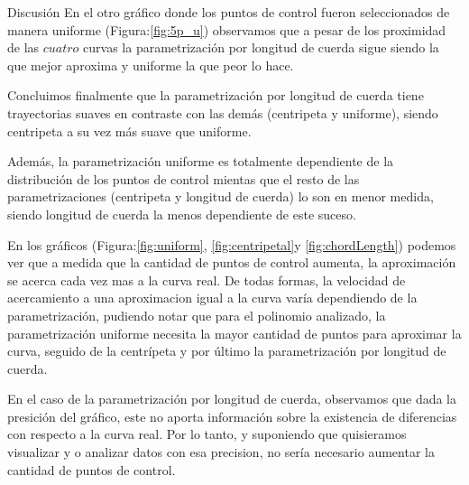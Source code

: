 \begin{section}{Discusión}
	En el otro gráfico donde los puntos de control fueron seleccionados de manera uniforme (Figura:\ref{fig:5p_u}) observamos que a pesar de los proximidad de las $cuatro$ curvas la parametrización por longitud de cuerda sigue siendo la que mejor aproxima y uniforme la que peor lo hace.
	
	Concluimos finalmente que la parametrización por longitud de cuerda tiene trayectorias suaves en contraste con las demás (centripeta y uniforme), siendo centripeta a su vez más suave que uniforme. 
	
	Además, la parametrización uniforme es totalmente dependiente de la distribución de los puntos de control mientas que el resto de las parametrizaciones (centripeta y longitud de cuerda) lo son en menor medida, siendo longitud de cuerda la menos dependiente de este suceso.
	
	En los gráficos (Figura:\ref{fig:uniform}, \ref{fig:centripetal}y \ref{fig:chordLength}) podemos ver que a medida que la cantidad de puntos de control aumenta, la aproximación se acerca cada vez mas a la curva real. De todas formas, la velocidad de acercamiento a una aproximacion igual a la curva varía dependiendo de la parametrización, pudiendo notar que para el polinomio analizado, la parametrización uniforme necesita la mayor cantidad de puntos para aproximar la curva, seguido de la centrípeta y por último la parametrización por longitud de cuerda.
	
	En el caso de la parametrización por longitud de cuerda, observamos que dada la presición del gráfico, este no aporta información sobre la existencia de diferencias con respecto a la curva real. Por lo tanto, y suponiendo que quisieramos visualizar y o analizar datos con esa precision, no sería necesario aumentar la cantidad de puntos de control.
	
	
	


	
\end{section}
